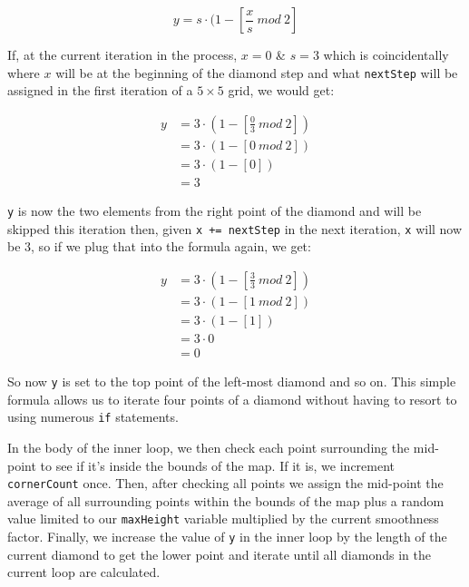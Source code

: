 \documentclass{article}
\begin{document}
\begin{equation}
y=s \cdot (1 - \left[\frac{x}{s} \ mod \ 2\right]
\end{equation}

If, at the current iteration in the process, $x=0$ \& $s=3$ which is coincidentally where $x$ will be at the beginning of the diamond step and what \texttt{nextStep} will be assigned in the first iteration of a $5 \times 5$ grid, we would get:

\begin{equation}
\begin{split}
y&=3 \cdot (1 - \left[\frac{0}{3} \ mod \ 2\right]) \\
&=3 \cdot (1 - \left[0 \ mod \ 2\right]) \\
&=3 \cdot (1 - [0]) \\
&=3
\end{split}
\end{equation}

\texttt{y} is now the two elements from the right point of the diamond and will be skipped this iteration then, given \texttt{x += nextStep} in the next iteration, \texttt{x} will now be $3$, so if we plug that into the formula again, we get:

\begin{equation}
\begin{split}
y&=3 \cdot (1 - \left[\frac{3}{3} \ mod \ 2\right]) \\
&=3 \cdot (1 - \left[1 \ mod \ 2\right]) \\
&=3 \cdot (1 - [1]) \\
&=3 \cdot 0 \\
&=0
\end{split}
\end{equation}

So now \texttt{y} is set to the top point of the left-most diamond and so on. This simple formula allows us to iterate four points of a diamond without having to resort to using numerous \texttt{if} statements.

In the body of the inner loop, we then check each point surrounding the mid-point to see if it's inside the bounds of the map. If it is, we increment \texttt{cornerCount} once. Then, after checking all points we assign the mid-point the average of all surrounding points within the bounds of the map plus a random value limited to our \texttt{maxHeight} variable multiplied by the current smoothness factor. Finally, we increase the value of \texttt{y} in the inner loop by the length of the current diamond to get the lower point and iterate until all diamonds in the current loop are calculated.
\end{document}

